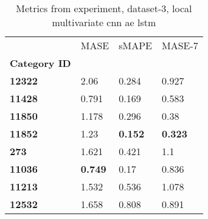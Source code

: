 \begin{table}[H]
\centering
\caption{Metrics from experiment, dataset-3, local multivariate cnn ae lstm}
\label{table:local-multivariate-cnn-ae-lstm-dataset-3}
\begin{tabular}{llll}
\toprule
{} &            MASE &           sMAPE &          MASE-7 \\
\textbf{Category ID} &                 &                 &                 \\
\midrule
\textbf{12322      } &            2.06 &           0.284 &           0.927 \\
\textbf{11428      } &           0.791 &           0.169 &           0.583 \\
\textbf{11850      } &           1.178 &           0.296 &            0.38 \\
\textbf{11852      } &            1.23 &  \textbf{0.152} &  \textbf{0.323} \\
\textbf{273        } &           1.621 &           0.421 &             1.1 \\
\textbf{11036      } &  \textbf{0.749} &            0.17 &           0.836 \\
\textbf{11213      } &           1.532 &           0.536 &           1.078 \\
\textbf{12532      } &           1.658 &           0.808 &           0.891 \\
\bottomrule
\end{tabular}
\end{table}
